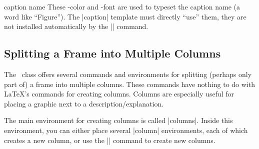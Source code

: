 \begin{element}{caption name}\no\yes\yes
  These \beamer-color and -font are used to typeset the caption name
  (a word like ``Figure''). The |caption| template must directly
  ``use'' them, they are not installed automatically by the
  |\insertcaptionname| command.
\end{element}





\subsection{Splitting a Frame into Multiple Columns}

The \beamer\ class offers several commands and environments for
splitting (perhaps only part of) a frame into multiple columns. These
commands have nothing to do with \LaTeX's commands for creating
columns. Columns are especially useful for placing a graphic next to a
description/explanation.

The main environment for creating columns is called |columns|. Inside
this environment, you can either place several |column| environments,
each of which creates a new column, or use the |\column| command to
create new columns.

